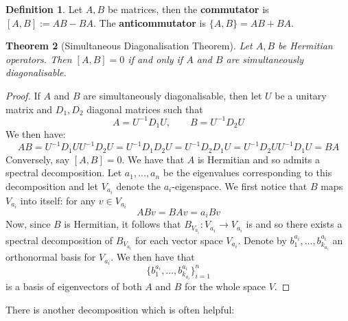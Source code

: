 \documentclass[12pt]{article}
\theoremstyle{plain}
\newtheorem{thm}{Theorem}[subsection] %
\theoremstyle{definition}
\newtheorem{defn}[thm]{Definition} %
\newcommand{\lto}{\longrightarrow}
\begin{document}
\begin{defn}
	Let $A,B$ be matrices, then the \textbf{commutator} is $[A,B] := AB - BA$. The \textbf{anticommutator} is $\lbrace A,B \rbrace = AB + BA$.
\end{defn}
\begin{thm}[Simultaneous Diagonalisation Theorem]
	Let $A,B$ be Hermitian operators. Then $[A,B] = 0$ if and only if $A$ and $B$ are simultaneously diagonalisable.
\end{thm}
\begin{proof}
	If $A$ and $B$ are simultaneously diagonalisable, then let $U$ be a unitary matrix and $D_1,D_2$ diagonal matrices such that
	\begin{equation}
		A = U^{-1}D_1U,\qquad B = U^{-1}D_2U
	\end{equation}
	We then have:
	\begin{equation}
		AB = U^{-1}D_1UU^{-1}D_2U = U^{-1}D_1D_2U = U^{-1}D_2D_1U = U^{-1}D_2UU^{-1}D_1U = BA
	\end{equation}
	Conversely, say $[A,B] = 0$. We have that $A$ is Hermitian and so admits a spectral decomposition. Let $a_1,...,a_n$ be the eigenvalues corresponding to this decomposition and let $V_{a_i}$ denote the $a_i$-eigenspace. We first notice that $B$ maps $V_{a_i}$ into itself: for any $v \in V_{a_i}$
	\begin{equation}
		ABv = BAv = a_{i}Bv
	\end{equation}
	Now, since $B$ is Hermitian, it follows that $B_{V_{a_i}}: V_{a_i} \lto V_{a_i}$ is and so there exists a spectral decomposition of $B_{V_{a_i}}$ for each vector space $V_{a_i}$. Denote by $b_1^{a_i},...,b_{k_{a_i}}^{a_i}$ an orthonormal basis for $V_{a_i}$. We then have that
	\begin{equation}
		\lbrace b_1^{a_i},...,b_{k_{a_i}}^{a_i}\rbrace_{i = 1}^n
	\end{equation}
	is a basis of eigenvectors of both $A$ and $B$ for the whole space $V$.
\end{proof}
There is another decomposition which is often helpful:
\end{document}
